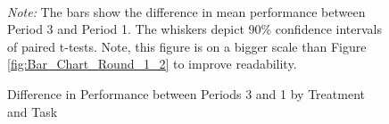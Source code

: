 \newpage

\begin{figure}[H]
	\caption{Difference in Performance between Periods 3 and 1 by Treatment and Task}
	\label{fig:Bar_Chart_Round_1_3}
	\qquad
	\\
	\begin{minipage}{0.9\textwidth}
	\footnotesize
	{\it Note:} The bars show the difference in mean performance between Period 3 and Period 1. The whiskers depict 90\% confidence intervals of paired t-tests. Note, this figure is on a bigger scale than Figure \ref{fig:Bar_Chart_Round_1_2} to improve readability.
	\end{minipage}
\end{figure}


\newpage